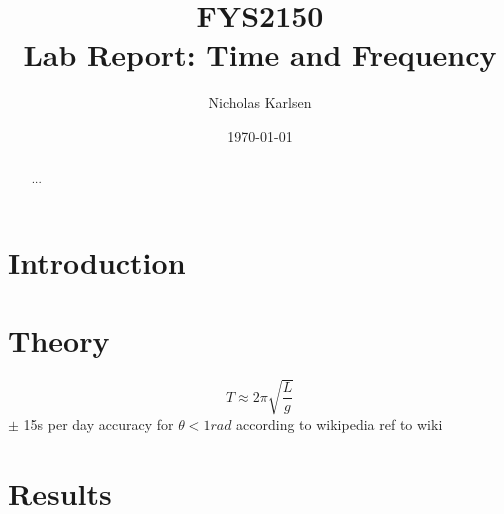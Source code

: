 \documentclass[%
 reprint,
 amsmath,amssymb,
 aps,
]{revtex4-1}
\begin{document}

\title{FYS2150 \\
Lab Report: Time and Frequency}%

\author{Nicholas Karlsen}

\date{\today}%

\begin{abstract}
...
\end{abstract}

\maketitle


\section{\label{sec:intro}Introduction}

\section{\label{sec:theory}Theory}

\begin{equation}
    T \approx 2\pi \sqrt{\frac{L}{g}}    
\end{equation}
$\pm$ 15s per day accuracy for $\theta < 1 rad$ according to wikipedia ref to wiki

\section{\label{sec:data} Results}

\begin{table}
\centering
{}
\end{table}
    
\end{document}
